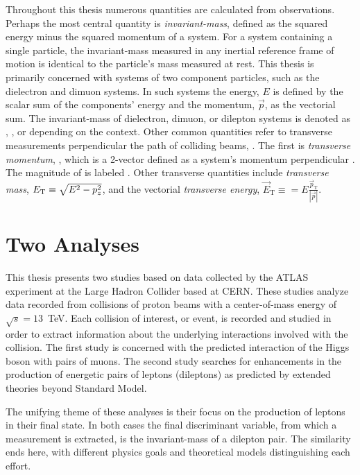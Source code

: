 Throughout this thesis numerous quantities are calculated from observations.
Perhaps the most central quantity is \emph{invariant-mass}, defined as the squared energy minus the squared momentum of a system.
For a system containing a single particle, the invariant-mass measured in any inertial reference frame of motion is identical to the particle's mass measured at rest.
This thesis is primarily concerned with systems of two component particles, such as the dielectron and dimuon systems.
In such systems the energy, $E$ is defined by the scalar sum of the components' energy and the momentum, $\vec{p}$, as the vectorial sum.
The invariant-mass of dielectron, dimuon, or dilepton systems is denoted as \mee, \muu, or \mll depending on the context.
Other common quantities refer to transverse measurements perpendicular the path of colliding beams, \zhat.
The first is \emph{transverse momentum}, \vecpt, which is a 2-vector defined as a system's momentum perpendicular \zhat.
The magnitude of \vecpt is labeled \pt.
Other transverse quantities include \emph{transverse mass}, $E_\text{T}\equiv \sqrt{E^2-p_z^2}$, and the vectorial \emph{transverse energy}, $\vec{E}_\text{T}\equiv=E\frac{\vec{p}_\text{T}}{|\vec{p}|}$.

\section{Two Analyses}
This thesis presents two studies based on data collected by the ATLAS experiment at the Large Hadron Collider based at CERN.
These studies analyze data recorded from collisions of proton beams with a center-of-mass energy of $\sqrt{s}=13$~TeV.
Each collision of interest, or event, is recorded and studied in order to extract information about the underlying interactions involved with the collision. 
The first study is concerned with the predicted interaction of the Higgs boson with pairs of muons.
The second study searches for enhancements in the production of energetic pairs of leptons (dileptons) as predicted by extended theories beyond Standard Model. 

The unifying theme of these analyses is their focus on the production of leptons in their final state.
In both cases the final discriminant variable, from which a measurement is extracted, is the invariant-mass of a dilepton pair. 
The similarity ends here, with different physics goals and theoretical models distinguishing each effort.

